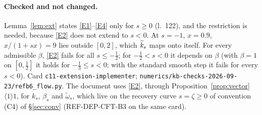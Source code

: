 \documentclass[11pt]{article}
\begin{document}
\paragraph{Checked and not changed.}  Lemma~\ref{lem:ext} states \ref{E1}--\ref{E4} only for
$s\ge0$ (l.~122), and the restriction is needed, because \ref{E2} does not extend to $s<0$.  At
$s=-1$, $x=0.9$, $x/(1+sx)=9$ lies outside $[0,2]$, which $\widetilde k_s$ maps onto itself.  For every
admissible $\beta$, \ref{E2} fails for all $s\le-\frac12$; for $-\frac12<s<0$ it depends on $\beta$
(with $\beta=1$ on $[0,\frac12]$ it holds for $-\frac13\le s<0$; with the standard smooth step it
fails for every $s<0$).  Card \texttt{c11-extension-implementer};
\texttt{numerics/kb-checks-2026-09-23/refb6\_flow.py}.  The document uses \ref{E2}, through
Proposition~\ref{prop:vector} $\langle1\rangle1$, for $k_s$, $\beta_s$ and $\widetilde\omega_s$,
which live on the recovery curve $s=\zeta\ge0$ of convention (C4) of \S\ref{sec:conv} (REF-DEP-CFT-B3 on the same card).
\end{document}
